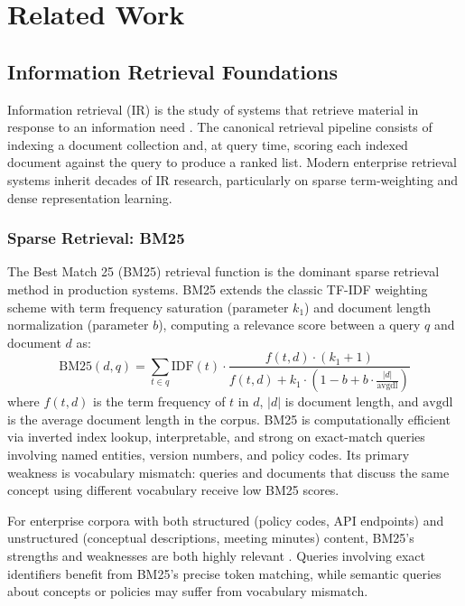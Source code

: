 \chapter{Related Work}
\label{chap:litreview}

\section{Information Retrieval Foundations}
\label{sec:lit_ir}

Information retrieval (IR) is the study of systems that retrieve material in response to an information need \citep{manning2008ir}. The canonical retrieval pipeline consists of indexing a document collection and, at query time, scoring each indexed document against the query to produce a ranked list. Modern enterprise retrieval systems inherit decades of IR research, particularly on sparse term-weighting and dense representation learning.

\subsection{Sparse Retrieval: BM25}
The Best Match 25 (BM25) retrieval function \citep{robertson1995okapi,robertson2009bm25} is the dominant sparse retrieval method in production systems. BM25 extends the classic TF-IDF weighting scheme with term frequency saturation (parameter $k_1$) and document length normalization (parameter $b$), computing a relevance score between a query $q$ and document $d$ as:
\begin{equation}
    \text{BM25}(d, q) = \sum_{t \in q} \text{IDF}(t) \cdot \frac{f(t,d) \cdot (k_1 + 1)}{f(t,d) + k_1 \cdot (1 - b + b \cdot \frac{|d|}{\text{avgdl}})}
    \label{eq:bm25}
\end{equation}
where $f(t,d)$ is the term frequency of $t$ in $d$, $|d|$ is document length, and $\text{avgdl}$ is the average document length in the corpus. BM25 is computationally efficient via inverted index lookup, interpretable, and strong on exact-match queries involving named entities, version numbers, and policy codes. Its primary weakness is vocabulary mismatch: queries and documents that discuss the same concept using different vocabulary receive low BM25 scores.

For enterprise corpora with both structured (policy codes, API endpoints) and unstructured (conceptual descriptions, meeting minutes) content, BM25's strengths and weaknesses are both highly relevant \citep{robertson2004understanding}. Queries involving exact identifiers benefit from BM25's precise token matching, while semantic queries about concepts or policies may suffer from vocabulary mismatch.

